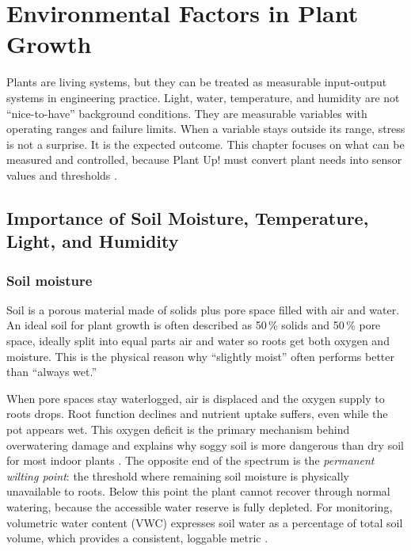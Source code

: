 ﻿\section{Environmental Factors in Plant Growth}

Plants are living systems, but they can be treated as measurable input-output systems in engineering practice. Light, water, temperature, and humidity are not ``nice-to-have'' background conditions. They are measurable variables with operating ranges and failure limits. When a variable stays outside its range, stress is not a surprise. It is the expected outcome. This chapter focuses on what can be measured and controlled, because Plant Up! must convert plant needs into sensor values and thresholds \cite{ncStateSoils}.
\subsection{Importance of Soil Moisture, Temperature, Light, and Humidity}

\subsubsection*{Soil moisture}
Soil is a porous material made of solids plus pore space filled with air and water. An ideal soil for plant growth is often described as 50\,\% solids and 50\,\% pore space, ideally split into equal parts air and water so roots get both oxygen and moisture. This is the physical reason why ``slightly moist'' often performs better than ``always wet.'' \cite{ncStateSoils}

When pore spaces stay waterlogged, air is displaced and the oxygen supply to roots drops. Root function declines and nutrient uptake suffers, even while the pot appears wet. This oxygen deficit is the primary mechanism behind overwatering damage and explains why soggy soil is more dangerous than dry soil for most indoor plants \cite{ucIpmAeration}.
The opposite end of the spectrum is the \textit{permanent wilting point}: the threshold where remaining soil moisture is physically unavailable to roots. Below this point the plant cannot recover through normal watering, because the accessible water reserve is fully depleted. For monitoring, volumetric water content (VWC) expresses soil water as a percentage of total soil volume, which provides a consistent, loggable metric \cite{cornellWiltingPoint, meterGroupWater}.
